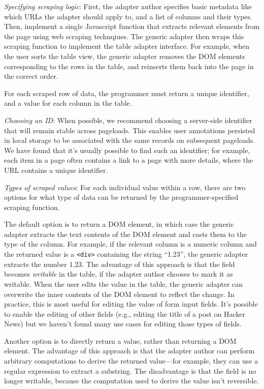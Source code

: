 \documentclass[sigplan,screen,10pt,anonymous,review]{acmart}
\begin{document}
\emph{Specifying scraping logic}: First, the adapter author specifies
basic metadata like which URLs the adapter should apply to, and a list
of columns and their types. Then, implement a single Javascript function
that extracts relevant elements from the page using web scraping
technqiues. The generic adapter then wraps this scraping function to
implement the table adapter interface. For example, when the user sorts
the table view, the generic adapter removes the DOM elements
corresponding to the rows in the table, and reinserts them back into the
page in the correct order.

For each scraped row of data, the programmer must return a unique
identifier, and a value for each column in the table.

\emph{Choosing an ID}: When possible, we recommend choosing a
server-side identifier that will remain stable across pageloads. This
enables user annotations persisted in local storage to be associated
with the same records on subsequent pageloads. We have found that it's
usually possible to find such an identifier; for example, each item in a
page often contains a link to a page with more details, where the URL
contains a unique identifier.

\emph{Types of scraped values}: For each individual value within a row,
there are two options for what type of data can be returned by the
programmer-specified scraping function.

The default option is to return a DOM element, in which case the generic
adapter extracts the text contents of the DOM element and casts them to
the type of the column. For example, if the relevant column is a numeric
column and the returned value is a \texttt{\textless{}div\textgreater{}}
containing the string ``1.23'', the generic adapter extracts the number
1.23. The advantage of this approach is that the field becomes
\emph{writable} in the table, if the adapter author chooses to mark it
as writable. When the user edits the value in the table, the generic
adapter can overwrite the inner contents of the DOM element to reflect
the change. In practice, this is most useful for editing the value of
form input fields. It's possible to enable the editing of other fields
(e.g., editing the title of a post on Hacker News) but we haven't found
many use cases for editing those types of fields.

Another option is to directly return a value, rather than returning a
DOM element. The advantage of this approach is that the adapter author
can perform arbitrary computations to derive the returned value---for
example, they can use a regular expression to extract a substring. The
disadvantage is that the field is no longer writable, because the
computation used to derive the value isn't reversible.
\end{document}
